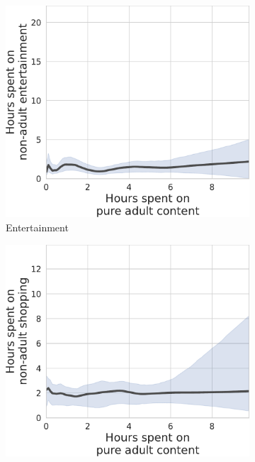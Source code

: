 \documentclass[12pt,twoside]{article}
\begin{document}
\begin{figure}[!h]
\caption{Time Spent on Online Pure Pornography vs. Non-adult Leisure}
\label{fig:tu_prop_entertainment-prop_pure_adult}
     \centering
     \begin{subfigure}[b]{0.495\textwidth}
         \centering
         \includegraphics[width=\textwidth]{figs/tu_duration_entertainment-duration_pure_adult.pdf}
         \caption{Entertainment}
     \end{subfigure}
     \hfill
     \begin{subfigure}[b]{0.495\textwidth}
         \centering
         \includegraphics[width=\textwidth]{figs/tu_duration_shop-duration_pure_adult.pdf}

\end{subfigure}
\end{figure}
\end{document}
